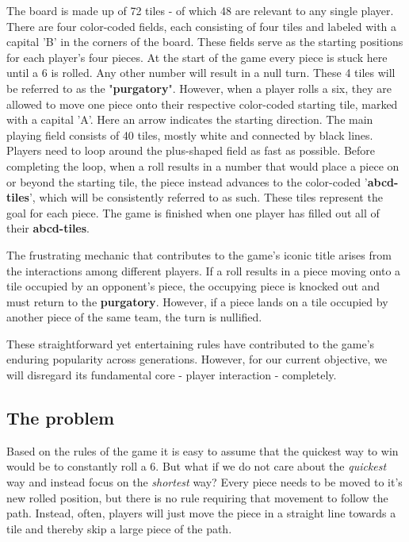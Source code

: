 \documentclass[12pt]{article}
\begin{document}
The board is made up of 72 tiles - of which 48 are relevant to any single player.
There are four color-coded fields, each consisting of four tiles and labeled with a capital 'B' in the corners of the board. These fields serve as the starting positions for each player's four pieces. At the start of the game every piece is stuck here until a 6 is rolled. Any other number will result in a null turn. These 4 tiles will be referred to as the "\textbf{purgatory}". However, when a player rolls a six, they are allowed to move one piece onto their respective color-coded starting tile, marked with a capital 'A'. Here an arrow indicates the starting direction. 
The main playing field consists of 40 tiles, mostly white and connected by black lines.
Players need to loop around the plus-shaped field as fast as possible.
Before completing the loop, when a roll results in a number that would place a piece on or beyond the starting tile, the piece instead advances to the color-coded '\textbf{abcd-tiles}', which will be consistently referred to as such. These tiles represent the goal for each piece. The game is finished when one player has filled out all of their \textbf{abcd-tiles}.

The frustrating mechanic that contributes to the game's iconic title arises from the interactions among different players. If a roll results in a piece moving onto a tile occupied by an opponent's piece, the occupying piece is knocked out and must return to the \textbf{purgatory}.
However, if a piece lands on a tile occupied by another piece of the same team, the turn is nullified.

These straightforward yet entertaining rules have contributed to the game's enduring popularity across generations. However, for our current objective, we will disregard its fundamental core - player interaction - completely.



\subsection{The problem}
Based on the rules of the game it is easy to assume that the quickest way to win would be to constantly roll a 6.
But what if we do not care about the \textit{quickest} way and instead focus on the \textit{shortest} way?
Every piece needs to be moved to it's new rolled position, but there is no rule requiring that movement to follow the path.
Instead, often, players will just move the piece in a straight line towards a tile and thereby skip a large piece of the path. 
\end{document}
